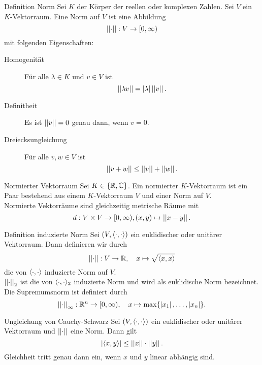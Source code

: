 \documentclass[main.tex]{subfiles}
\begin{document}
\begin{karte}{Definition Norm}
    Sei \(K\) der Körper der reellen oder komplexen Zahlen. Sei \(V\) ein \(K\)-Vektorraum.
    Eine Norm auf \(V\) ist eine Abbildung
    \[ \left|\left|\cdot\right|\right| : V \rightarrow [0, \infty) \]
    mit folgenden Eigenschaften:
    \begin{description}
        \item[Homogenität] Für alle \(\lambda \in K\) und \(v \in V\) ist 
        \[ \left|\left|\lambda v\right|\right| = \left| \lambda \right| \left|\left|v\right|\right|. \]
        \item[Definitheit] Es ist \(\left|\left|v\right|\right| = 0\) genau dann, wenn \(v = 0\).
        \item[Dreiecksungleichung] Für alle \(v, w \in V\) ist
        \[ \left|\left|v+w\right|\right| \leq \left|\left|v\right|\right| + \left|\left|w\right|\right|. \]   
    \end{description}
\end{karte}

\begin{karte}{Normierter Vektorraum}
    Sei \(K \in \{\mathbb{R}, \mathbb{C}\}\). Ein normierter \(K\)-Vektorraum ist ein Paar bestehend
    aus einem \(K\)-Vektorraum \(V\) und einer Norm auf \(V\).\\
    Normierte Vektorräume sind gleichzeitig metrische Räume mit
    \[ d : V\times V \rightarrow [0, \infty), (x, y) \mapsto \left|\left|x-y\right|\right|. \]
\end{karte}

\begin{karte}{Definition induzierte Norm}
    Sei \((V, \langle \cdot, \cdot \rangle)\) ein euklidischer oder unitärer Vektorraum.
    Dann definieren wir durch
    \[ \left|\left|\cdot\right|\right| : V \rightarrow \mathbb{R}, \quad x \mapsto \sqrt{\langle x, x \rangle} \]
    die von \(\langle \cdot, \cdot \rangle\) induzierte Norm auf \(V\).\\
    \(\left|\left|\cdot\right|\right|_2\) ist die von \(\langle \cdot, \cdot \rangle_2\) induzierte Norm und
    wird als euklidische Norm bezeichnet.\\
    Die Supremumsnorm ist definiert durch 
    \[ \left|\left|\cdot\right|\right|_\infty : \mathbb{R}^n \rightarrow [0,\infty), \quad
    x \mapsto \max\{\left| x_1 \right|, \ldots, \left| x_n \right|\}. \]
\end{karte}

\begin{karte}{Ungleichung von Cauchy-Schwarz}
    Sei \((V, \langle \cdot, \cdot \rangle)\) ein euklidischer oder unitärer Vektorraum
    und \(\left|\left|\cdot\right|\right|\) eine Norm. Dann gilt
    \[ \left| \langle x, y \rangle \right| \leq \left|\left|x\right|\right| \cdot \left|\left|y\right|\right|. \]
    Gleichheit tritt genau dann ein, wenn \(x\) und \(y\) linear abhängig sind.
\end{karte}
\end{document}
